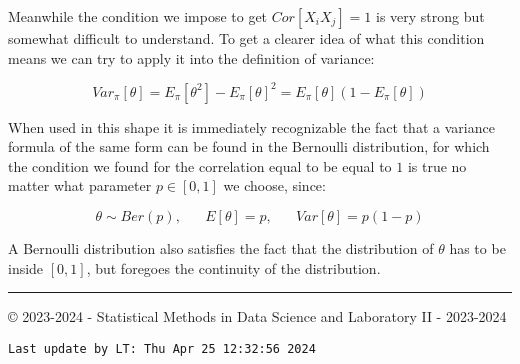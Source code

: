 \documentclass[
]{article}
\begin{document}
Meanwhile the condition we impose to get \(Cor[X_i X_j] = 1\) is very
strong but somewhat difficult to understand. To get a clearer idea of
what this condition means we can try to apply it into the definition of
variance:

\[
Var_\pi[\theta] =
E_\pi[\theta^2] - E_\pi[\theta]^2 =
E_\pi[\theta](1-E_\pi[\theta])
\]

When used in this shape it is immediately recognizable the fact that a
variance formula of the same form can be found in the Bernoulli
distribution, for which the condition we found for the correlation equal
to be equal to \(1\) is true no matter what parameter \(p \in [0,1]\) we
choose, since:

\[
\theta \sim Ber(p), \;\;\;\;\;\; E[\theta] = p, \;\;\;\;\;\; Var[\theta]=p(1-p)
\]

A Bernoulli distribution also satisfies the fact that the distribution
of \(\theta\) has to be inside \([0, 1]\), but foregoes the continuity
of the distribution.

\vspace{4cm}

\begin{center}\rule{0.5\linewidth}{0.5pt}\end{center}

© 2023-2024 - Statistical Methods in Data Science and Laboratory II -
2023-2024

\begin{verbatim}
Last update by LT: Thu Apr 25 12:32:56 2024
\end{verbatim}
\end{document}
